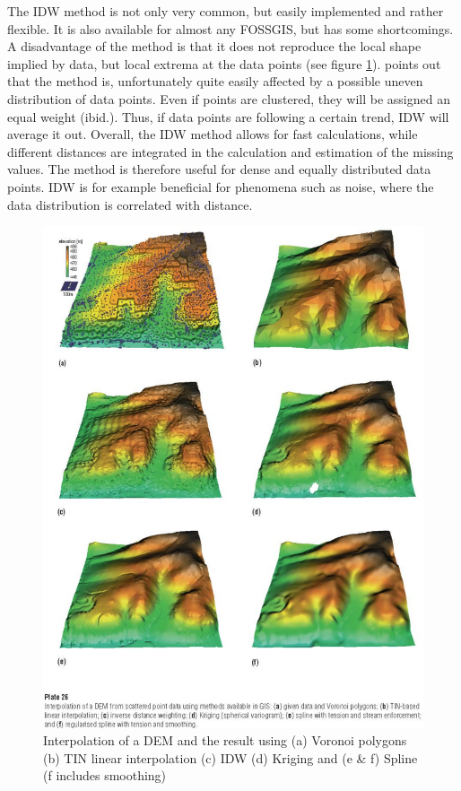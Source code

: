 The IDW method is not only very common, but easily implemented and rather flexible. It is also available for almost any FOSSGIS, but has some shortcomings. A disadvantage of the method is that it does not reproduce the local shape implied by data, but local extrema at the data points (see figure \ref{fig:dem_mitas}). \cite{mitas_spatial_1999} \citeauthor{lam_spatial_2009} points out that the method is, unfortunately quite easily affected by a possible uneven distribution of data points. Even if points are clustered, they will be assigned an equal weight (ibid.). Thus, if data points are following a certain trend, IDW will average it out. 
Overall, the IDW method allows for fast calculations, while different distances are integrated in the calculation and estimation of the missing values. \cite{gitta_raumliche_2016} The method is therefore useful for dense and equally distributed data points. \cite{wasser_going_2020} IDW is for example beneficial for phenomena such as noise, where the data distribution is correlated with distance. \cite{gis_resources_choosing_2013}

\begin{figure}
	\includegraphics[width=\linewidth]{images/dem.png}
	\caption{Interpolation of a DEM and the result using (a) Voronoi polygons (b) TIN linear interpolation (c) IDW (d) Kriging and (e \& f) Spline (f includes smoothing) \cite{mitas_spatial_1999}}
	\label{fig:dem_mitas}
\end{figure}



